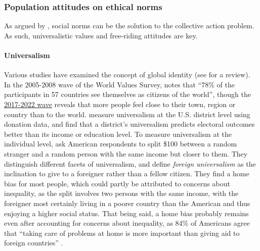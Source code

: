
\subsubsection{Population attitudes on ethical norms}\label{subsubsec:literature_wealth_tax}
As argued by \citet{nyborg_social_2016}, social norms can be the solution to the collective action problem. As such, universalistic values and free-riding attitudes are key. %

\paragraph{Universalism}
Various studies have examined the concept of global identity (see %
\citet{reysen_psychology_2018} for a review). In the 2005-2008 wave of the World Values Survey, \citet{bayram_what_2015} notes that ``78\% of the participants in 57 countries see themselves as citizens of the world'', though the \href{https://www.worldvaluessurvey.org/WVSDocumentationWV7.jsp}{2017-2022 wave} reveals that more people feel close to their town, region or country than to the world. \citet{enke_universalism_2023} measure universalism at the U.S. district level using donation data, and find that a district's universalism predicts electoral outcomes better than its income or education level. To measure universalism at the individual level, \citet{enke_moral_2023-1} ask American respondents to split \$100 between a random stranger and a random person with the same income but closer to them. They distinguish different facets of universalism, and define \textit{foreign universalism} as the inclination to give to a foreigner rather than a fellow citizen. They find a home bias for most people, which could partly be attributed to concerns about inequality, as the split involves two persons with the same income, with the foreigner most certainly living in a poorer country than the American and thus enjoying a higher social status. 
That being said, a home bias probably remains even after accounting for concerns about  inequality, as 84\% of Americans agree that ``taking care of problems at home is more important than giving aid to foreign countries'' \citep{pipa_americans_2001}. 
